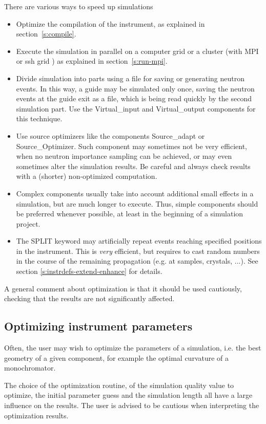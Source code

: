 There are various ways to speed up simulations
\begin{itemize}
\item Optimize the compilation of the instrument, as explained in
  section~\ref{s:compile}.
\item Execute the simulation in parallel on a computer grid or a cluster (with
  MPI or ssh grid ) as explained in section~\ref{s:run-mpi}.
\item Divide simulation into parts using a file for saving or generating neutron
  events. In this way, a guide may be simulated only once, saving the neutron
  events at the guide exit as a file, which is being read quickly by the second
  simulation part. Use the Virtual\_input and Virtual\_output components for
  this technique.
\item Use source optimizers like the components Source\_adapt or
  Source\_Optimizer. Such component may sometimes not be very efficient, when no
  neutron importance sampling can be achieved, or may even sometimes alter the
  simulation results. Be careful and always check results with a (shorter)
  non-optimized computation.
\item Complex components usually take into account additional small effects in a
  simulation, but are much longer to execute. Thus, simple components should be
  preferred whenever possible, at least in the beginning of a simulation project.
\item The SPLIT keyword may artificially repeat events reaching specified
  positions in the instrument. This is \emph{very} efficient, but requires to
  cast random numbers in the course of the remaining propagation (e.g. at
  samples, crystals, ...). See section \ref{s:instrdefs-extend-enhance} for
  details.
\end{itemize}
A general comment about optimization is that it should be used cautiously,
checking that the results are not significantly affected.

\subsection{Optimizing instrument parameters}
\label{s:optimize}
Often, the user may wish to optimize the parameters of a simulation, i.e. the
best geometry of a given component, for example the optimal curvature of a
monochromator.

The choice of the optimization routine, of the simulation quality value to
optimize, the initial parameter guess and the simulation length all have a large
influence on the results.  The user is advised to be cautious when interpreting
the optimization results.

